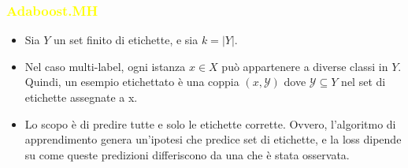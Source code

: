 \documentclass[handout
]{beamer}
\def\yellow#1{{\textcolor{yellow}{#1}}}
\begin{document}
\begin{frame}
\frametitle{\yellow{Adaboost.MH}}
\begin{itemize}
 \item Sia \begin{math}
     Y 
    \end{math} un set finito di etichette, e sia \begin{math}
                                                           k = |Y|
                                                          \end{math}.
\item Nel caso multi-label, ogni istanza \begin{math}
     x \in X 
    \end{math} pu\`o appartenere a diverse classi in \begin{math}
                                                      Y
                                                     \end{math}. Quindi, un esempio etichettato \`e una coppia 
\begin{math}(x,\mathcal{Y})\end{math} dove \begin{math}
                                  \mathcal{Y} \subseteq Y
                                 \end{math} nel set di etichette assegnate a x.
\item Lo scopo \`e di predire tutte e solo le etichette corrette. Ovvero, l'algoritmo 
di apprendimento genera un'ipotesi che predice set di etichette, e la loss dipende su come queste predizioni 
differiscono da una che \`e stata osservata. 
\end{itemize}
\end{frame}
\end{document}
